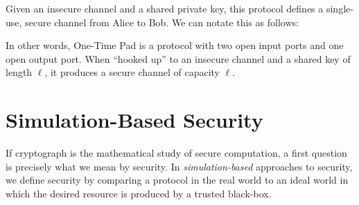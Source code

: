 \noindent
Given an insecure channel and a shared private key, this protocol defines a
single-use, secure channel from Alice to Bob. We can notate this as follows:
\begin{figure}[H]
  \centering
\end{figure}

In other words, One-Time Pad is a protocol with two open input ports and one
open output port\footnotemark. When ``hooked up'' to an insecure channel and a shared key of
length $\ell$, it produces a secure channel of capacity $\ell$.




\section{Simulation-Based Security}

If cryptograph is the mathematical study of secure computation, a first question
is precisely what we mean by security. In \emph{simulation-based} approaches to
security, we define security by comparing a protocol in the real world to an
ideal world in which the desired resource is produced by a trusted black-box.
